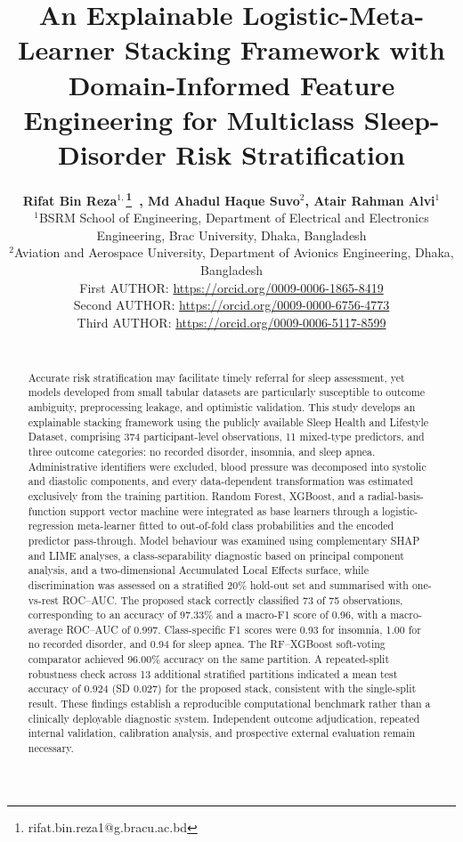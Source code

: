 \documentclass{elektr}
\title{An Explainable Logistic-Meta-Learner Stacking Framework with Domain-Informed Feature Engineering for Multiclass Sleep-Disorder Risk Stratification}
\author[AUTHOR and AUTHOR]{
	\textbf{Rifat Bin Reza$^{1,}$\thanks{rifat.bin.reza1@g.bracu.ac.bd}~, Md Ahadul Haque Suvo$^{2}$, Atair Rahman Alvi$^{1}$}\\
	$^{1}$BSRM School of Engineering, Department of Electrical and Electronics Engineering, Brac University, Dhaka, Bangladesh\\ 	
	$^{2}$Aviation and Aerospace University, Department of Avionics Engineering, Dhaka, Bangladesh\\
  First AUTHOR: \url{https://orcid.org/0009-0006-1865-8419} \\
  Second AUTHOR: \url{https://orcid.org/0009-0000-6756-4773} \\
  Third AUTHOR: \url{https://orcid.org/0009-0006-5117-8599} \\
  \\ 
\rec{...}
\acc{...}
\finv{...}
}
\begin{document}
\raggedbottom

\maketitle

\begin{abstract}Accurate risk stratification may facilitate timely referral for sleep assessment, yet models developed from small tabular datasets are particularly susceptible to outcome ambiguity, preprocessing leakage, and optimistic validation. This study develops an explainable stacking framework using the publicly available Sleep Health and Lifestyle Dataset, comprising 374 participant-level observations, 11 mixed-type predictors, and three outcome categories: no recorded disorder, insomnia, and sleep apnea. Administrative identifiers were excluded, blood pressure was decomposed into systolic and diastolic components, and every data-dependent transformation was estimated exclusively from the training partition. Random Forest, XGBoost, and a radial-basis-function support vector machine were integrated as base learners through a logistic-regression meta-learner fitted to out-of-fold class probabilities and the encoded predictor pass-through. Model behaviour was examined using complementary SHAP and LIME analyses, a class-separability diagnostic based on principal component analysis, and a two-dimensional Accumulated Local Effects surface, while discrimination was assessed on a stratified 20\% hold-out set and summarised with one-vs-rest ROC--AUC. The proposed stack correctly classified 73 of 75 observations, corresponding to an accuracy of 97.33\% and a macro-F1 score of 0.96, with a macro-average ROC--AUC of 0.997. Class-specific F1 scores were 0.93 for insomnia, 1.00 for no recorded disorder, and 0.94 for sleep apnea. The RF--XGBoost soft-voting comparator achieved 96.00\% accuracy on the same partition. A repeated-split robustness check across 13 additional stratified partitions indicated a mean test accuracy of 0.924 (SD 0.027) for the proposed stack, consistent with the single-split result. These findings establish a reproducible computational benchmark rather than a clinically deployable diagnostic system. Independent outcome adjudication, repeated internal validation, calibration analysis, and prospective external evaluation remain necessary.

\end{abstract}
\end{document}
